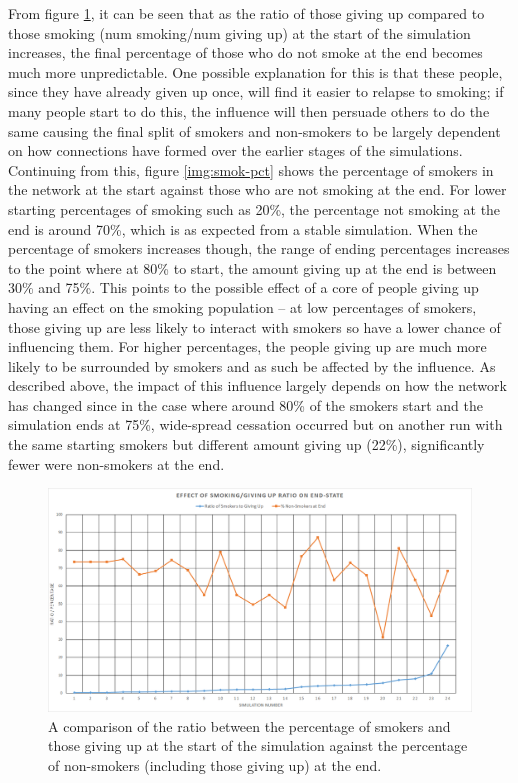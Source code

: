 \documentclass[]{report}
\begin{document}
From figure \ref{img:smok-give}, it can be seen that as the ratio of those giving up compared to those smoking (num smoking/num giving up) at the start of the simulation increases, the final percentage of those who do not smoke at the end becomes much more unpredictable. One possible explanation for this is that these people, since they have already given up once, will find it easier to relapse to smoking; if many people start to do this, the influence will then persuade others to do the same causing the final split of smokers and non-smokers to be largely dependent on how connections have formed over the earlier stages of the simulations. Continuing from this, figure \ref{img:smok-pct} shows the percentage of smokers in the network at the start against those who are not smoking at the end. For lower starting percentages of smoking such as 20\%, the percentage not smoking at the end is around 70\%, which is as expected from a stable simulation. When the percentage of smokers increases though, the range of ending percentages increases to the point where at 80\% to start, the amount giving up at the end is between 30\% and 75\%. This points to the possible effect of a core of people giving up having an effect on the smoking population – at low percentages of smokers, those giving up are less likely to interact with smokers so have a lower chance of influencing them. For higher percentages, the people giving up are much more likely to be surrounded by smokers and as such be affected by the influence. As described above, the impact of this influence largely depends on how the network has changed since in the case where around 80\% of the smokers start and the simulation ends at 75\%, wide-spread cessation occurred but on another run with the same starting smokers but different amount giving up (22\%), significantly fewer were non-smokers at the end.

\begin{figure}
\label{img:smok-give}
\begin{center}
\includegraphics[width=\textwidth]{smok-giveup.png}
\end{center}
\caption{A comparison of the ratio between the percentage of smokers and those giving up at the start of the simulation against the percentage of non-smokers (including those giving up) at the end.}
\end{figure}
\end{document}
